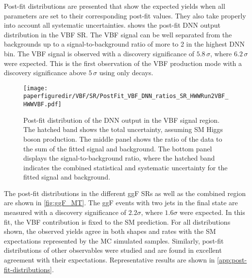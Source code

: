 Post-fit distributions are presented that show the expected yields when all parameters are set to their corresponding post-fit values. They also take properly into account all systematic uncertainties.  shows the post-fit DNN output distribution in the VBF SR.
The VBF signal can be well separated from the backgrounds up to a signal-to-background ratio of more to 2 in the highest DNN bin. 
The VBF signal is observed with a discovery significance of $5.8\,\sigma$, where $6.2\,\sigma$ were expected.
This is the first observation of the VBF production mode with a discovery significance above $5\,\sigma$ using only \HWW decays.
\begin{figure}[htb]
  \centering
  \texttt{[image: \\paperfiguredir/VBF/SR/PostFit\_VBF\_DNN\_ratios\_SR\_HWWRun2VBF\_HWWVBF.pdf]}
  \caption{
    Post-fit distribution of the DNN output in the VBF signal region.
    The hatched band shows the total uncertainty, assuming SM Higgs boson production.
    The middle panel shows the ratio of the data to the sum of the fitted signal and background.
    The bottom panel displays the signal-to-background ratio, where the hatched band indicates the combined statistical and systematic uncertainty for the fitted signal and background.
  }
  \label{fig:VBF_DNN}
  \end{figure}
The post-fit \mT distributions in the different ggF SRs as well as the combined region are shown in \cref{fig:ggF_MT}.
The ggF events with two jets in the final state are measured with a discovery significance of $2.2\sigma$, where $1.6\sigma$ were expected. In this fit, the VBF contribution is fixed to the SM prediction.
For all distributions shown, the observed yields agree in both shapes and rates with the SM expectations represented by the MC simulated samples. 
Similarly, post-fit distributions of other observables were studied and are found in excellent agreement with their expectations. Representative results are shown in \cref{app:post-fit-distributions}. 

